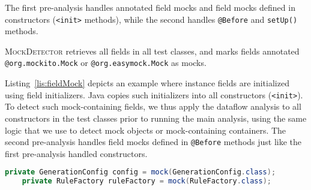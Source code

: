 The first pre-analysis handles annotated field mocks and field mocks defined in constructors (\texttt{<init>} methods), while the second handles \texttt{@Before} and \texttt{setUp()} methods. 

\textsc{MockDetector} retrieves all fields in all test classes, and marks fields annotated {\tt @org.mockito.Mock} or {\tt @org.easymock.Mock} as mocks.

Listing~\ref{lis:fieldMock} depicts an example where instance fields are initialized using field initializers. Java copies such initializers into all constructors (\texttt{<init>}). To detect such mock-containing fields, we thus apply the dataflow analysis to all constructors in the test classes prior to running the main analysis, using the same logic that we use to detect mock objects or mock-containing containers. The second pre-analysis handles field mocks defined in \texttt{@Before} methods just like the first pre-analysis handled constructors.



    

\begin{lstlisting}[basicstyle=\ttfamily, caption={Field mocks defined by field initializations from \texttt{TypeRuleTest} \\ in jsonschema2pojo.},
basicstyle=\scriptsize\ttfamily,language = Java, framesep=4.5mm,
framexleftmargin=1mm, captionpos=b, label=lis:fieldMock, numbers=none]
	private GenerationConfig config = mock(GenerationConfig.class);
	private RuleFactory ruleFactory = mock(RuleFactory.class);
\end{lstlisting}

